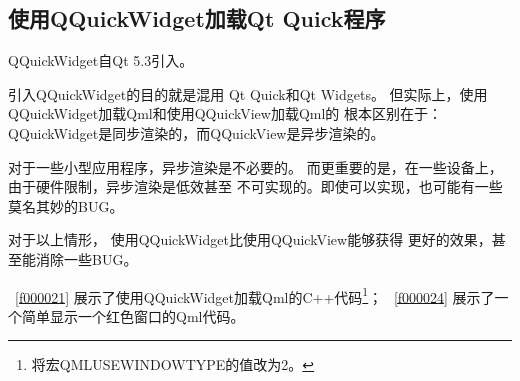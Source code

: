 \FloatBarrier
\subsection{
使用QQuickWidget加载Qt Quick程序
}\label{ss001110}


QQuickWidget自Qt 5.3引入。

引入QQuickWidget的目的就是混用
Qt Quick和Qt Widgets。
但实际上，使用QQuickWidget加载Qml和使用QQuickView加载Qml的
根本区别在于：
QQuickWidget是同步渲染的，而QQuickView是异步渲染的。

对于一些小型应用程序，异步渲染是不必要的。
而更重要的是，在一些设备上，由于硬件限制，异步渲染是低效甚至
不可实现的。即使可以实现，也可能有一些莫名其妙的BUG。

对于以上情形，
使用QQuickWidget比使用QQuickView能够获得
更好的效果，甚至能消除一些BUG。

\lstlistingname\ \ref{f000021}
展示了使用QQuickWidget加载Qml的C{\sourcefonttwo{}+}{\sourcefonttwo{}+}代码\footnote{
将宏QML\underline{\hspace{0.5em}}USE\underline{\hspace{0.5em}}WINDOW\underline{\hspace{0.5em}}TYPE的值改为2。
}；
\lstlistingname\ \ref{f000024}
展示了一个简单显示一个红色窗口的Qml代码。

